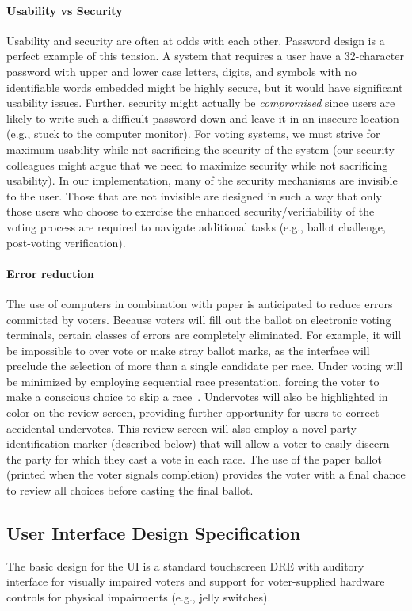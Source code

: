 \paragraph{Usability vs Security}
Usability and security are often at odds with each other. 
Password design is a perfect example of this tension. 
A system that requires a user have a
32-character password with upper and lower case letters, digits, and symbols with no identifiable words embedded might be highly secure, but it would have significant usability issues. 
Further, security might actually be \emph{compromised} since users are likely 
to write such a difficult password down and leave it in an insecure location 
(e.g., stuck to the computer monitor). 
For voting systems, 
we must strive for maximum usability while not sacrificing the security of the system (our security colleagues might argue that we need to maximize security while not sacrificing usability). 
In our implementation, many of the security mechanisms are invisible to the user. 
Those that are not invisible are designed in such a way that only those users who choose to exercise the enhanced security/verifiability of the voting process are required to navigate additional tasks (e.g., ballot challenge, post-voting verification). 
\paragraph{Error reduction}
The use of computers in combination with paper is anticipated to reduce errors committed by voters. Because voters will fill out the ballot on electronic voting terminals, certain classes of errors are completely eliminated. For example, it will be impossible to over vote or make stray ballot marks, as the interface will preclude the selection of more than a single candidate per race. Under voting will be minimized by employing sequential race presentation, forcing the voter to make a conscious choice to skip a race~\cite{greene-thesis}. Undervotes will also be highlighted in color on the review screen, providing further opportunity for users to 
correct accidental undervotes. 
This review screen will also employ a novel party identification marker (described below) 
that will allow a voter to easily discern the party for which they cast a vote in each race. 
The use of the paper ballot (printed when the voter signals completion) provides 
the voter with a final chance to review all choices before casting the final ballot. 

\subsection{User Interface Design Specification}
The basic design for the UI is a standard touchscreen DRE with auditory interface for visually impaired voters and support for voter-supplied hardware controls for physical impairments (e.g., jelly switches).
